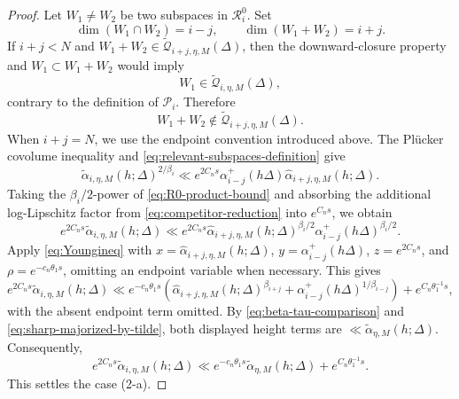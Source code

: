 \documentclass[10pt,a4paper]{amsart}
\begin{document}
\begin{proof}
Let $W_1\ne W_2$ be two subspaces in $\mathcal R_i^0$. Set
$$
\dim(W_1\cap W_2)=i-j,
\qquad
\dim(W_1+W_2)=i+j.
$$
If $i+j<N$ and
$W_1+W_2\in
\widetilde{\mathscr Q}_{i+j,\eta,M}(\Delta)$,
then the downward-closure property and
$W_1\subset W_1+W_2$ would imply
\[
W_1\in\widetilde{\mathscr Q}_{i,\eta,M}(\Delta),
\]
contrary to the definition of $\mathcal P_i$. Therefore
\[
W_1+W_2
\notin
\widetilde{\mathscr Q}_{i+j,\eta,M}(\Delta).
\]
When $i+j=N$, we use the endpoint convention introduced above.
The Pl\"ucker covolume inequality and
\eqref{eq:relevant-subspaces-definition} give
\begin{equation}\label{eq:R0-product-bound}
\widetilde\alpha_{i,\eta,M}(h;\Delta)^{2/\beta_i}
\ll
e^{2C_ns}
\alpha_{i-j}^+(h\Delta)
\widehat\alpha_{i+j,\eta,M}(h;\Delta).
\end{equation}
Taking the $\beta_i/2$-power of
\eqref{eq:R0-product-bound} and absorbing the additional log-Lipschitz
factor from \eqref{eq:competitor-reduction} into $e^{C_ns}$, we obtain
$$
e^{2C_ns}\widetilde\alpha_{i,\eta,M}(h;\Delta)\ll e^{2C_ns}
\widehat\alpha_{i+j,\eta,M}(h;\Delta)^{\beta_i/2}
\alpha_{i-j}^+(h\Delta)^{\beta_i/2}.
$$
Apply \eqref{eq:Youngineq} with
$x=\widehat\alpha_{i+j,\eta,M}(h;\Delta)$,
$y=\alpha_{i-j}^+(h\Delta)$, $z=e^{2C_ns}$, and
$\rho=e^{-c_n\theta_1s}$, omitting an endpoint variable when necessary.
This gives
$$
e^{2C_ns}\widetilde\alpha_{i,\eta,M}(h;\Delta)
\ll
 e^{-c_n\theta_1 s}
\left(
\widehat\alpha_{i+j,\eta,M}(h;\Delta)^{\beta_{i+j}}
+
\alpha_{i-j}^+(h\Delta)^{1/\beta_{i-j}}
\right)
+e^{C_n\theta_1^{-1}s},
$$
with the absent endpoint term omitted. By \eqref{eq:beta-tau-comparison} and
\eqref{eq:sharp-majorized-by-tilde}, both displayed height terms are
$\ll \widetilde\alpha_{\eta,M}(h;\Delta)$. Consequently,
\begin{equation}\label{eq:R0-contraction}
e^{2C_ns}\widetilde\alpha_{i,\eta,M}(h;\Delta)
\ll e^{-c_n\theta_1 s}\widetilde\alpha_{\eta,M}(h;\Delta)
+e^{C_n\theta_1^{-1}s}.
\end{equation}
This settles the case (2-a).



\end{proof}
\end{document}
